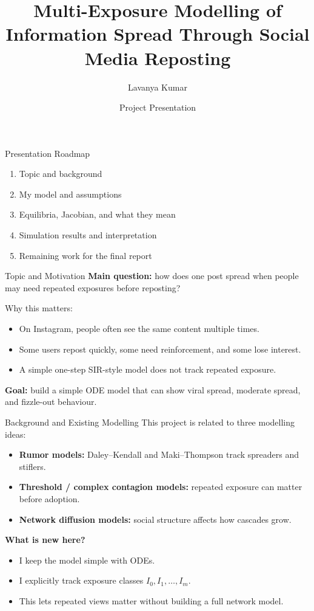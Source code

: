 \documentclass[aspectratio=169]{beamer}
\title{Multi-Exposure Modelling of Information Spread Through Social Media Reposting}
\author{Lavanya Kumar}
\institute{MATH 4090}
\date{Project Presentation}
\begin{document}
\begin{frame}
  \titlepage
\end{frame}

\begin{frame}{Presentation Roadmap}
  \begin{enumerate}
    \item Topic and background
    \item My model and assumptions
    \item Equilibria, Jacobian, and what they mean
    \item Simulation results and interpretation
    \item Remaining work for the final report
  \end{enumerate}
\end{frame}

\begin{frame}{Topic and Motivation}
  \textbf{Main question:} how does one post spread when people may need repeated exposures before reposting?

  \vspace{0.4em}
  Why this matters:
  \begin{itemize}
    \item On Instagram, people often see the same content multiple times.
    \item Some users repost quickly, some need reinforcement, and some lose interest.
    \item A simple one-step SIR-style model does not track repeated exposure.
  \end{itemize}

  \vspace{0.4em}
  \textbf{Goal:} build a simple ODE model that can show viral spread, moderate spread, and fizzle-out behaviour.
\end{frame}

\begin{frame}{Background and Existing Modelling}
  This project is related to three modelling ideas:
  \begin{itemize}
    \item \textbf{Rumor models:} Daley--Kendall and Maki--Thompson track spreaders and stiflers.
    \item \textbf{Threshold / complex contagion models:} repeated exposure can matter before adoption.
    \item \textbf{Network diffusion models:} social structure affects how cascades grow.
  \end{itemize}

  \vspace{0.5em}
  \textbf{What is new here?}
  \begin{itemize}
    \item I keep the model simple with ODEs.
    \item I explicitly track exposure classes $I_0, I_1, \dots, I_m$.
    \item This lets repeated views matter without building a full network model.
  \end{itemize}
\end{frame}
\end{document}
